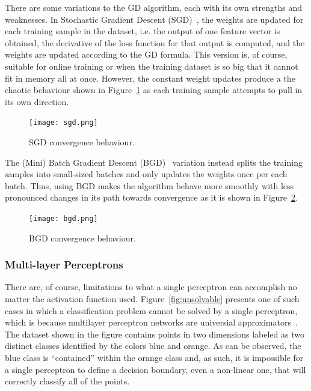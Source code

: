 There are some variations to the GD algorithm, each with its own strengths and
weaknesses. In Stochastic Gradient Descent (SGD)~\cite{gradient_descent}, the weights are updated for
each training sample in the dataset, i.e. the output of one feature vector is
obtained, the derivative of the loss function for that output is computed, and
the weights are updated according to the GD formula. This version is, of course,
suitable for online training or when the training dataset is so big that it
cannot fit in memory all at once. However, the constant weight updates produce a
the chaotic behaviour shown in Figure~\ref{fig:sgd} as each training sample
attempts to pull in its own direction.

\begin{figure}[!htbp]
    \centering
    \texttt{[image: sgd.png]}
    \caption{SGD convergence behaviour.}
    \label{fig:sgd}
\end{figure}

The (Mini) Batch Gradient Descent (BGD)~\cite{gradient_descent} variation instead splits the training
samples into small-sized batches and only updates the weights once per each
batch. Thus, using BGD makes the algorithm behave more smoothly with less
pronounced changes in its path towards convergence as it is shown in
Figure~\ref{fig:bgd}.

\begin{figure}[!htbp]
    \centering
    \texttt{[image: bgd.png]}
    \caption{BGD convergence behaviour.}
    \label{fig:bgd}
\end{figure}

\subsubsection{Multi-layer Perceptrons}

There are, of course, limitations to what a single perceptron can accomplish no
matter the activation function used. Figure~\ref{fig:unsolvable} presents one of
such cases in which a classification problem cannot be solved by a single
perceptron, which is because multilayer perceptron networks are universial
approximators~\cite{HORNIK1989359}. The dataset shown
in the figure contains points in two dimensions labeled as two distinct classes
identified by the colors blue and orange. As can be observed, the blue class is
``contained'' within the orange class and, as such, it is impossible for a
single perceptron to define a decision boundary, even a non-linear one, that
will correctly classify all of the points. 

